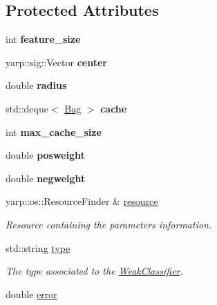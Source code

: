 \subsection*{Protected Attributes}
\begin{DoxyCompactItemize}
\item 
int {\bfseries feature\+\_\+size}\label{classiCub_1_1boostMIL_1_1MILClassifier_aa4d1b6445abf5781a1ea90df19faf520}

\item 
yarp\+::sig\+::\+Vector {\bfseries center}\label{classiCub_1_1boostMIL_1_1MILClassifier_acac5e6869d83a2292a3e03ab0eb77824}

\item 
double {\bfseries radius}\label{classiCub_1_1boostMIL_1_1MILClassifier_a643d9303a92c03e0de747b4d04b8baf6}

\item 
std\+::deque$<$ \hyperlink{structiCub_1_1boostMIL_1_1Bag}{Bag} $>$ {\bfseries cache}\label{classiCub_1_1boostMIL_1_1MILClassifier_afbc5f9e764bb320112c239c9f0ad1032}

\item 
int {\bfseries max\+\_\+cache\+\_\+size}\label{classiCub_1_1boostMIL_1_1MILClassifier_a9e3a91087c6068dd623f3bdb67580607}

\item 
double {\bfseries posweight}\label{classiCub_1_1boostMIL_1_1MILClassifier_a09bc9e253511b1f7b4deedc77f05e9ab}

\item 
double {\bfseries negweight}\label{classiCub_1_1boostMIL_1_1MILClassifier_a9ab7c6185ae6cfb288304800bf2e6066}

\item 
yarp\+::os\+::\+Resource\+Finder \& \hyperlink{classiCub_1_1boostMIL_1_1WeakClassifier_a5a7df0cc2cbb505e5b40dd59d3a4933b}{resource}\label{classiCub_1_1boostMIL_1_1WeakClassifier_a5a7df0cc2cbb505e5b40dd59d3a4933b}

\begin{DoxyCompactList}\small\item\em Resource containing the parameters information. \end{DoxyCompactList}\item 
std\+::string \hyperlink{classiCub_1_1boostMIL_1_1WeakClassifier_a6e08c26ea2e12086317d6cdd0f65bbd9}{type}\label{classiCub_1_1boostMIL_1_1WeakClassifier_a6e08c26ea2e12086317d6cdd0f65bbd9}

\begin{DoxyCompactList}\small\item\em The type associated to the \hyperlink{classiCub_1_1boostMIL_1_1WeakClassifier}{Weak\+Classifier}. \end{DoxyCompactList}\item 
double \hyperlink{classiCub_1_1boostMIL_1_1WeakClassifier_afa9e7bb9b9a92d349b40a4f127386a59}{error}\label{classiCub_1_1boostMIL_1_1WeakClassifier_afa9e7bb9b9a92d349b40a4f127386a59}


\end{DoxyCompactItemize}
